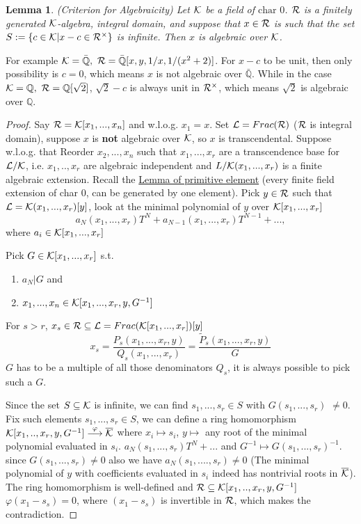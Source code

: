 \documentclass[11pt]{article}
\newtheorem{lemma}[thm]{Lemma}
\newcommand{\ratl}{\mathbb Q}
\newcommand{\calk}{{\cal K}}
\newcommand{\call}{{\cal L}}
\newcommand{\calr}{{\cal R}}
\newcommand{\lrta}{\longrightarrow}
\begin{document}
\begin{lemma}(Criterion for Algebraicity)
Let $\calk$ be a field of $\text{char } 0$. $\calr$ is a finitely generated $\calk$-algebra, integral domain, and suppose that $x\in \calr$ is such that the set $S:=\{c\in \calk|x-c\in \calr^{\times}\}$ is infinite. Then $x$ is algebraic over $\calk$.
\end{lemma}
For example $\calk=\bar{\ratl}, \ \calr=\bar{\ratl}[x,y,1/x,1/(x^2+2)]$. For $x-c$ to be unit, then only possibility is  $c=0$, which means $x$ is not algebraic over $\bar{\ratl}$. While in the case
$\calk=\ratl, \ \calr=\ratl[\sqrt{2}]$, $\sqrt{2}-c$ is always unit in $\calr^\times$, which means $\sqrt{2}$ is algebraic over $\ratl$.
\begin{proof}
Say $\calr=\calk[x_1,...,x_n]$ and w.l.o.g. $x_1=x$. Set $\call=Frac(\calr)$ ($\calr$ is integral domain), suppose $x$ is \textbf{not} algebraic over $\calk$, so $x$ is transcendental. Suppose w.l.o.g. that
Reorder $x_2,...,x_n$ such that  $x_1,...,x_r$ are a transcendence base for $\call/\calk$, i.e. $x_1,..,x_r$ are algebraic independent and $L/\calk(x_1,...,x_r)$ is a finite algebraic extension. Recall the \href{https://en.wikipedia.org/wiki/Primitive_element_theorem}{Lemma of primitive element} (every finite field extension of char $0$, can be generated by one element). Pick $y\in \calr$ such that $\call=\calk(x_1,...,x_r)[y]$, look at the minimal polynomial of $y$ over $\calk[x_1,...,x_r]$
$$
a_N(x_1,...,x_r)T^N+a_{N-1}(x_1,...,x_r)T^{N-1}+...,
$$
where $a_i\in \calk[x_1,...,x_r]$

Pick $G\in \calk[x_1,...,x_r]$ s.t.
\begin{enumerate}[label=\arabic*)]
\item $a_N|G$ and
\item $x_1,...,x_n\in \calk[x_1,...,x_r,y,G^{-1}]$
\end{enumerate} 
For $s>r$, $x_s\in \calr\subseteq \call=Frac(\calk[x_1,...,x_r])[y]$
$$
x_s=\frac{P_s(x_1,...,x_r,y)}{Q_s(x_1,...,x_r)}=\frac{\tilde{P}_s(x_1,...,x_r,y)}{G}
$$
$G$ has to be a multiple of all those denominators $Q_s$, it is always possible to pick such a $G$.

Since the set $S\subseteq \calk$ is infinite, we can find $s_1,...,s_r\in S$ with $G(s_1,...,s_r)$ $\neq 0$. Fix such elements $s_1,...,s_r\in S$, we can  define a ring homomorphism $\calk[x_1,..,x_r,y,G^{-1}]\overset{\varphi}{\lrta} \overline{\calk}$ where $x_i\mapsto s_i$, $ y\mapsto$ any root of the minimal polynomial evaluated in $s_i$. $a_N(s_1,...,s_r)T^N+...$ and $G^{-1}\mapsto G(s_1,...,s_r)^{-1}$. since $G(s_1,...,s_r)\neq0$  also we have $a_N(s_1,....,s_r)\neq 0$ (The minimal polynomial of $y$ with coefficients evaluated in $s_i$ indeed has nontrivial roots in $\overline{\calk}$). The ring homomorphism is well-defined and $\calr\subseteq\calk[x_1,..,x_r,y,G^{-1}]$
$\varphi(x_1-s_s)=0$, where $(x_1-s_s)$ is invertible in $\calr$, which makes the contradiction.
\end{proof}
\end{document}
